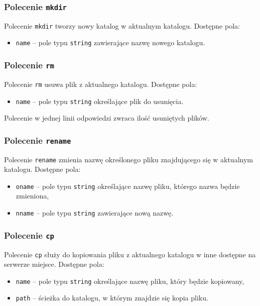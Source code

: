 \documentclass[8pt,a4paper]{article}
\begin{document}
\subsubsection{Polecenie \texttt{mkdir}}
Polecenie \texttt{mkdir} tworzy nowy katalog w aktualnym katalogu. Dostępne pola:
\begin{itemize}
    \item \texttt{name} -- pole typu \texttt{string} zawierające nazwę nowego katalogu.
\end{itemize}

\subsubsection{Polecenie \texttt{rm}}
Polecenie \texttt{rm} usuwa plik z aktualnego katalogu. Dostępne pola:
\begin{itemize}
    \item \texttt{name} -- pole typu \texttt{string} określające plik do usunięcia.
\end{itemize}
Polecenie w jednej linii odpowiedzi zwraca ilość usuniętych plików.

\subsubsection{Polecenie \texttt{rename}}
Polecenie \texttt{rename} zmienia nazwę określonego pliku znajdującego się w aktualnym katalogu. Dostępne pola:
\begin{itemize}
    \item \texttt{oname} -- pole typu \texttt{string} określające nazwę pliku, którego nazwa będzie zmieniona,
    \item \texttt{nname} -- pole typu \texttt{string} zawierające nową nazwę.
\end{itemize}

\subsubsection{Polecenie \texttt{cp}}
Polecenie \texttt{cp} służy do kopiowania pliku z aktualnego katalogu w inne dostępne na serwerze miejsce. Dostępne pola:
\begin{itemize}
    \item \texttt{name} -- pole typu \texttt{string} określające nazwę pliku, który będzie kopiowany,
    \item \texttt{path} -- ścieżka do katalogu, w którym znajdzie się kopia pliku.
\end{itemize}
\end{document}
